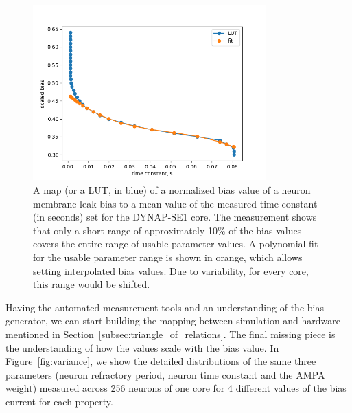 \begin{figure}[t!]
  \centering
  \includegraphics[width=0.8\textwidth]{img/chapter4/Bias_curve.png}
  \caption[Example of a LUT collected for a neuron's time constant]{A map (or a \ac{LUT}, in blue) of a normalized bias value of a neuron membrane leak bias to a mean value of the measured time constant (in seconds) set for the DYNAP-SE1 core. The measurement shows that only a short range of approximately 10\% of the bias values covers the entire range of usable parameter values. A polynomial fit for the usable parameter range is shown in orange, which allows setting interpolated bias values.
  Due to variability, for every core, this range would be shifted.}
  \label{fig:bias_curve_fit}
\end{figure}

Having the automated measurement tools and an understanding of the bias generator, we can start building the mapping between simulation and hardware mentioned in Section~\ref{subsec:triangle_of_relations}.
The final missing piece is the understanding of how the values scale with the bias value.
In Figure~\ref{fig:variance}, we show the detailed distributions of the same three parameters (neuron refractory period, neuron time constant and the AMPA weight) measured across 256 neurons of one core for 4 different values of the bias current for each property.

